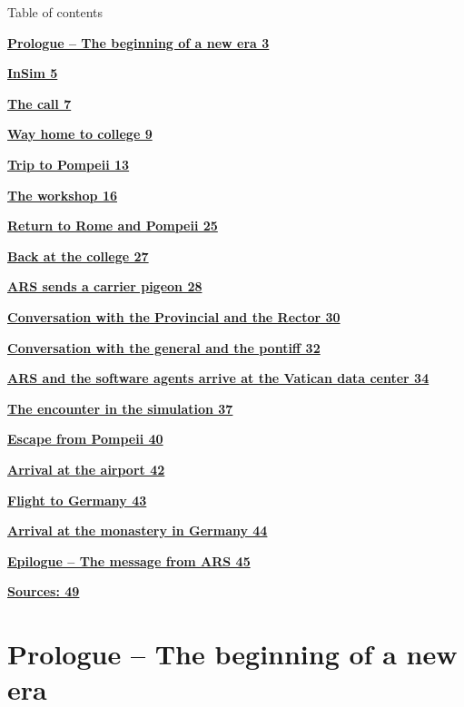 \documentclass[
]{article}
\begin{document}
Table of contents

\hyperref[prologue-the-beginning-of-a-new-era]{\textbf{Prologue -- The
beginning of a new era 3}}

\hyperref[insim]{\textbf{InSim 5}}

\hyperref[the-call]{\textbf{The call 7}}

\hyperref[way-home-to-college]{\textbf{Way home to college 9}}

\hyperref[trip-to-pompeii]{\textbf{Trip to Pompeii 13}}

\hyperref[the-workshop]{\textbf{The workshop 16}}

\hyperref[return-to-rome-and-pompeii]{\textbf{Return to Rome and Pompeii
25}}

\hyperref[back-at-the-college]{\textbf{Back at the college 27}}

\hyperref[ars-sends-a-carrier-pigeon]{\textbf{ARS sends a carrier pigeon
28}}

\hyperref[conversation-with-the-provincial-and-the-rector]{\textbf{Conversation
with the Provincial and the Rector 30}}

\hyperref[conversation-with-the-general-and-the-pontiff]{\textbf{Conversation
with the general and the pontiff 32}}

\hyperref[ars-and-the-software-agents-arrive-at-the-vatican-data-center]{\textbf{ARS
and the software agents arrive at the Vatican data center 34}}

\hyperref[the-encounter-in-the-simulation]{\textbf{The encounter in the
simulation 37}}

\hyperref[escape-from-pompeii]{\textbf{Escape from Pompeii 40}}

\hyperref[arrival-at-the-airport]{\textbf{Arrival at the airport 42}}

\hyperref[flight-to-germany]{\textbf{Flight to Germany 43}}

\hyperref[arrival-at-the-monastery-in-germany]{\textbf{Arrival at the
monastery in Germany 44}}

\hyperref[epilogue-the-message-from-ars]{\textbf{Epilogue -- The message
from ARS 45}}

\hyperref[sources]{\textbf{Sources: 49}}

\section{Prologue -- The beginning of a new
era}\label{prologue-the-beginning-of-a-new-era}
\end{document}
